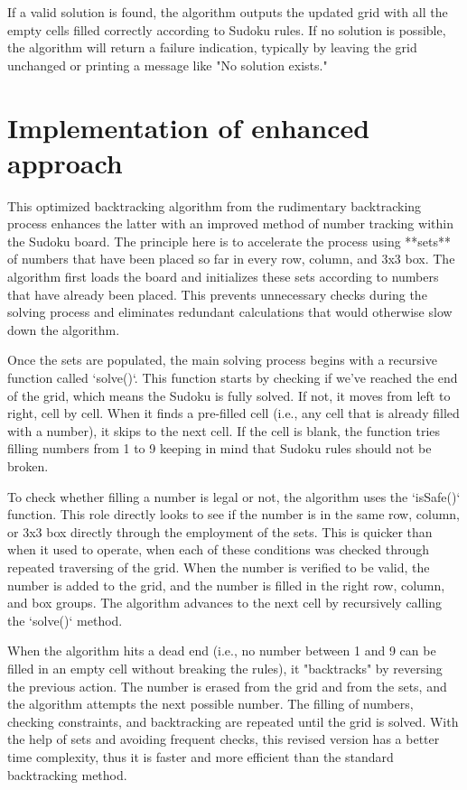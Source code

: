 \documentclass[conference]{IEEEtran}
\begin{document}
If a valid solution is found, the algorithm outputs the updated grid with all the empty cells filled correctly according to Sudoku rules. If no solution is possible, the algorithm will return a failure indication, typically by leaving the grid unchanged or printing a message like "No solution exists."
\section{Implementation of enhanced approach}
This optimized backtracking algorithm from the rudimentary backtracking process enhances the latter with an improved method of number tracking within the Sudoku board. The principle here is to accelerate the process using **sets** of numbers that have been placed so far in every row, column, and 3x3 box. The algorithm first loads the board and initializes these sets according to numbers that have already been placed. This prevents unnecessary checks during the solving process and eliminates redundant calculations that would otherwise slow down the algorithm.

Once the sets are populated, the main solving process begins with a recursive function called `solve()`. This function starts by checking if we’ve reached the end of the grid, which means the Sudoku is fully solved. If not, it moves from left to right, cell by cell. When it finds a pre-filled cell (i.e., any cell that is already filled with a number), it skips to the next cell. If the cell is blank, the function tries filling numbers from 1 to 9 keeping in mind that Sudoku rules should not be broken.

To check whether filling a number is legal or not, the algorithm uses the `isSafe()` function. This role directly looks to see if the number is in the same row, column, or 3x3 box directly through the employment of the sets. This is quicker than when it used to operate, when each of these conditions was checked through repeated traversing of the grid. When the number is verified to be valid, the number is added to the grid, and the number is filled in the right row, column, and box groups. The algorithm advances to the next cell by recursively calling the `solve()` method.

When the algorithm hits a dead end (i.e., no number between 1 and 9 can be filled in an empty cell without breaking the rules), it "backtracks" by reversing the previous action. The number is erased from the grid and from the sets, and the algorithm attempts the next possible number. The filling of numbers, checking constraints, and backtracking are repeated until the grid is solved. With the help of sets and avoiding frequent checks, this revised version has a better time complexity, thus it is faster and more efficient than the standard backtracking method.
\end{document}
